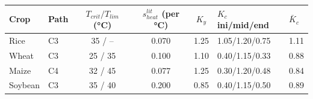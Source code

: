 \begin{tabular}{llcccll}
\toprule
Crop & Path & $T_{crit}/T_{lim}$ (\si{\celsius}) & $s^{lit}_{heat}$ (per \si{\celsius}) & $K_y$ & $K_c$ ini/mid/end & $\bar K_c$\\
\midrule
Rice & C3 & 35 / -- & 0.070 & 1.25 & 1.05/1.20/0.75 & 1.11 \\
Wheat & C3 & 25 / 35 & 0.100 & 1.10 & 0.40/1.15/0.33 & 0.88 \\
Maize & C4 & 32 / 45 & 0.077 & 1.25 & 0.30/1.20/0.48 & 0.84 \\
Soybean & C3 & 35 / 40 & 0.200 & 0.85 & 0.40/1.15/0.50 & 0.89 \\
\bottomrule
\end{tabular}
